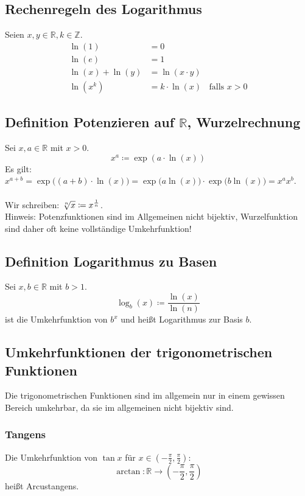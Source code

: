 \documentclass[halfparscip]{scrartcl}
\newcounter{subsection2}
\begin{document}
\subsection*{Rechenregeln des Logarithmus}
Seien $x,y \in \mathbb{R}, k \in \mathbb{Z}$.
\begin{align*}
	\ln(1) &= 0 \\
	\ln(e) &= 1 \\
	\ln(x) + \ln(y) &= \ln(x \cdot y)\\
	\ln(x^k) &= k \cdot \ln(x)\;\;\text{ falls }x > 0
\end{align*}

\subsection{Definition Potenzieren auf $\mathbb{R}$, Wurzelrechnung}
Sei $x,a \in \mathbb{R}$ mit $x > 0$.
\begin{equation*}
	x^a \coloneqq \exp(a \cdot \ln(x))
\end{equation*}
Es gilt: $x^{a+b} = \exp\big((a+b) \cdot \ln(x)\big) = \exp\big(a \ln(x)\big)\cdot \exp\big(b \ln(x)\big) = x^ax^b$.\\\\
Wir schreiben: $\sqrt[\uproot{1}n]{x} \coloneqq x^\frac{1}{n}$.\\
Hinweis: Potenzfunktionen sind im Allgemeinen nicht bijektiv, Wurzelfunktion sind daher oft keine vollständige Umkehrfunktion!

\subsection{Definition Logarithmus zu Basen}
Sei $x, b \in \mathbb{R}$ mit $b > 1$.
\begin{equation*}
	\log_b(x) \coloneqq \frac{\ln(x)}{\ln(n)}
\end{equation*}
ist die Umkehrfunktion von $b^x$ und heißt Logarithmus zur Basis $b$.

\subsection*{Umkehrfunktionen der trigonometrischen Funktionen}
Die trigonometrischen Funktionen sind im allgemein nur in einem gewissen Bereich umkehrbar, da sie im allgemeinen nicht bijektiv sind.
\subsubsection*{Tangens}
Die Umkehrfunktion von $\tan x$ für $x \in \left(-\frac{\pi}{2},\frac{\pi}{2}\right)$:
\begin{equation*}
	\arctan : \mathbb{R} \rightarrow \left(-\frac{\pi}{2},\frac{\pi}{2}\right)
\end{equation*}
heißt Arcustangens.
\end{document}
